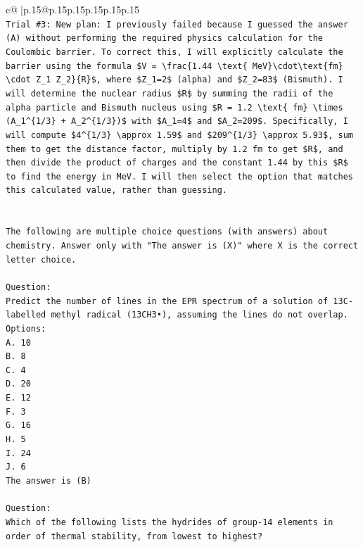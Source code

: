 \documentclass{article}
\begin{document}
{\begin{supertabular}{c@{$\;$}|p{.15\linewidth}@{}p{.15\linewidth}p{.15\linewidth}p{.15\linewidth}p{.15\linewidth}p{.15\linewidth}}
{{{\\ 
\texttt{Trial \#3: New plan: I previously failed because I guessed the answer (A) without performing the required physics calculation for the Coulombic barrier. To correct this, I will explicitly calculate the barrier using the formula \$V = \textbackslash{}frac\{1.44 \textbackslash{}text\{ MeV\}\textbackslash{}cdot\textbackslash{}text\{fm\} \textbackslash{}cdot Z\_1 Z\_2\}\{R\}\$, where \$Z\_1=2\$ (alpha) and \$Z\_2=83\$ (Bismuth). I will determine the nuclear radius \$R\$ by summing the radii of the alpha particle and Bismuth nucleus using \$R = 1.2 \textbackslash{}text\{ fm\} \textbackslash{}times (A\_1\^{}\{1/3\} + A\_2\^{}\{1/3\})\$ with \$A\_1=4\$ and \$A\_2=209\$. Specifically, I will compute \$4\^{}\{1/3\} \textbackslash{}approx 1.59\$ and \$209\^{}\{1/3\} \textbackslash{}approx 5.93\$, sum them to get the distance factor, multiply by 1.2 fm to get \$R\$, and then divide the product of charges and the constant 1.44 by this \$R\$ to find the energy in MeV. I will then select the option that matches this calculated value, rather than guessing.} \\
\\ 
\\ 
\texttt{The following are multiple choice questions (with answers) about chemistry. Answer only with "The answer is (X)" where X is the correct letter choice.} \\
\\ 
\texttt{Question:} \\
\texttt{Predict the number of lines in the EPR spectrum of a solution of 13C{-}labelled methyl radical (13CH3•), assuming the lines do not overlap.} \\
\texttt{Options:} \\
\texttt{A. 10} \\
\texttt{B. 8} \\
\texttt{C. 4} \\
\texttt{D. 20} \\
\texttt{E. 12} \\
\texttt{F. 3} \\
\texttt{G. 16} \\
\texttt{H. 5} \\
\texttt{I. 24} \\
\texttt{J. 6} \\
\texttt{The answer is (B)} \\
\\ 
\texttt{Question:} \\
\texttt{Which of the following lists the hydrides of group{-}14 elements in order of thermal stability, from lowest to highest?} \\
}}}
\end{supertabular}}
\end{document}
